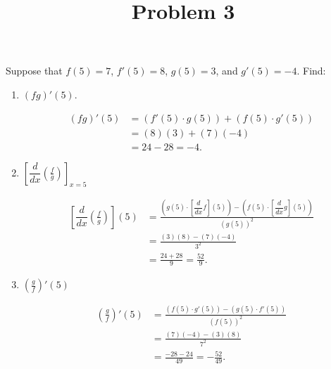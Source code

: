 \documentclass{ximera}
\title[Problem 3]{Problem 3}
\begin{document}
\begin{abstract} \end{abstract}
\maketitle


\begin{problem}
Suppose that $f(5) = 7$, $f'(5) = 8$, $g(5) = 3$, and $g'(5) = -4$.  Find:

	\begin{enumerate}

	\item  $(fg)'(5)$.
\begin{explanation}
		\begin{align*}
		(fg)'(5) &= (f'(5) \cdot g(5)) + (f(5) \cdot g'(5))  \\
		&= (8)(3) + (7)(-4)  \\
		&= 24 - 28 = -4.
		\end{align*}
		\end{explanation}
		
		

	\item $\left[ \dfrac{d}{dx} \left( \frac{f}{g} \right) \right]_{x=5}$
\begin{explanation}
		\begin{align*}
		\left[ \dfrac{d}{dx} \left( \frac{f}{g} \right) \right] (5) &= \frac{(g(5) \cdot \left[ \dfrac{d}{dx} f \right] (5)) - (f(5) \cdot \left[ \dfrac{d}{dx} g \right](5))}{(g(5))^2}  \\
		&= \frac{(3)(8) - (7)(-4)}{3^2}  \\
		&= \frac{24 + 28}{9} = \frac{52}{9}.
		\end{align*}
		\end{explanation}
		
		
	\item $ \left( \frac{g}{f} \right)' (5)$
\begin{explanation}
		\begin{align*}
		\left( \frac{g}{f} \right)' (5) &= \frac{(f(5) \cdot g'(5)) - (g(5) \cdot f'(5))}{(f(5))^2}  \\
		&= \frac{(7)(-4) - (3)(8)}{7^2}  \\
		&= \frac{-28 - 24}{49} = - \frac{52}{49}.
		\end{align*}
		\end{explanation}
		

\end{enumerate}
\end{problem}
\end{document}
